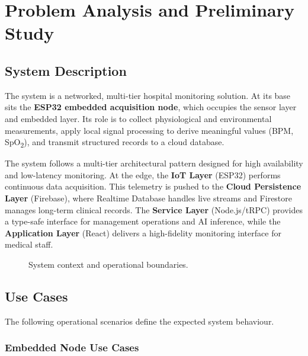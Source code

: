 \chapter{Problem Analysis and Preliminary Study}

\section{System Description}

The system is a networked, multi-tier hospital monitoring solution.
At its base sits the \textbf{ESP32 embedded acquisition node}, which occupies the
sensor layer and embedded layer. Its role is to collect physiological and environmental
measurements, apply local signal processing to derive meaningful values (BPM,
SpO\textsubscript{2}), and transmit structured records to a cloud database.

The system follows a multi-tier architectural pattern designed for high availability and low-latency monitoring. At the edge, the \textbf{IoT Layer} (ESP32) performs continuous data acquisition. This telemetry is pushed to the \textbf{Cloud Persistence Layer} (Firebase), where Realtime Database handles live streams and Firestore manages long-term clinical records. The \textbf{Service Layer} (Node.js/tRPC) provides a type-safe interface for management operations and AI inference, while the \textbf{Application Layer} (React) delivers a high-fidelity monitoring interface for medical staff.

\begin{figure}[H]
    \centering
    \caption{System context and operational boundaries.}
    \label{fig:system_context}
\end{figure}

\section{Use Cases}

The following operational scenarios define the expected system behaviour.

\subsection*{Embedded Node Use Cases}


